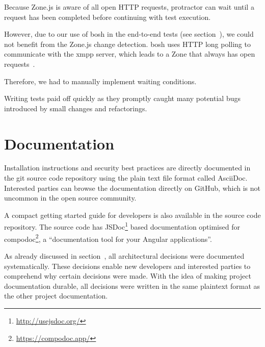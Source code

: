 Because Zone.js is aware of all open HTTP requests, protractor can wait until a request has been completed before continuing with test execution.

However, due to our use of \gls{bosh} in the end-to-end tests (see section~), we could not benefit from the Zone.js change detection.
\gls{bosh} uses HTTP long polling to communicate with the \gls{xmpp} server, which leads to a Zone that always has open requests~\cite{xep-0124}.

Therefore, we had to manually implement waiting conditions.

Writing tests paid off quickly as they promptly caught many potential bugs introduced by small changes and refactorings.

\section{Documentation}

Installation instructions and security best practices are directly documented in the git source code repository using the plain text file format called AsciiDoc.
Interested parties can browse the documentation directly on GitHub, which is not uncommon in the open source community.

A compact getting started guide for developers is also available in the source code repository.
The source code has JSDoc\footnote{\url{http://usejsdoc.org/}} based documentation optimised for compodoc\footnote{\url{https://compodoc.app/}}, a ``documentation tool for your Angular applications''.

As already discussed in section~, all architectural decisions were documented systematically.
These decisions enable new developers and interested parties to comprehend why certain decisions were made.
With the idea of making project documentation durable, all decisions were written in the same plaintext format as the other project documentation.
